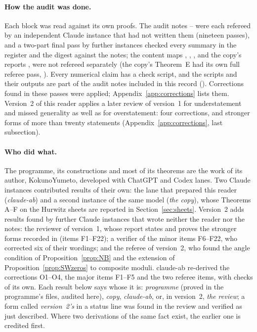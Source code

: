 \paragraph{How the audit was done.}
Each block was read against its own proofs.
The audit notes -- were each refereed by an independent Claude instance that had not written them (nineteen passes), and a two-part final pass by further instances checked every summary in the register and the digest against the notes; the content maps , , ,  and the copy's reports ,  were not refereed separately (the copy's Theorem~E had its own full referee pass, ).
Every numerical claim has a check script, and the scripts and their outputs are part of the audit notes included in this record ().
Corrections found in these passes were applied; Appendix~\ref{app:corrections} lists them. Version~2 of this reader applies a later review of version~1 for understatement and missed generality as well as for overstatement: four corrections, and stronger forms of more than twenty statements (Appendix~\ref{app:corrections}, last subsection).

\paragraph{Who did what.}
The programme, its constructions and most of its theorems are the work of its author, KokunoYumeto, developed with ChatGPT and Codex lanes.
Two Claude instances contributed results of their own: the lane that prepared this reader (\emph{claude-ab}) and a second instance of the same model (\emph{the copy}), whose Theorems A--F on the Hurwitz sheets are reported in Section~\ref{sec:sheets}.
Version~2 adds results found by further Claude instances that wrote neither the reader nor the notes: the reviewer of version~1, whose report states and proves the stronger forms recorded in  (items F1--F22); a verifier of the minor items F6--F22, who corrected six of their wordings; and the referee of version~2, who found the angle condition of Proposition~\ref{prop:NB} and the extension of Proposition~\ref{prop:SWzeros} to composite moduli. claude-ab re-derived the corrections O1--O4, the major items F1--F5 and the two referee items, with checks of its own. Each result below says whose it is: \emph{programme} (proved in the programme's files, audited here), \emph{copy}, \emph{claude-ab}, or, in version~2, \emph{the review}; a form called \emph{version~2's} in a status line was found in the review and verified as just described.
Where two derivations of the same fact exist, the earlier one is credited first.

